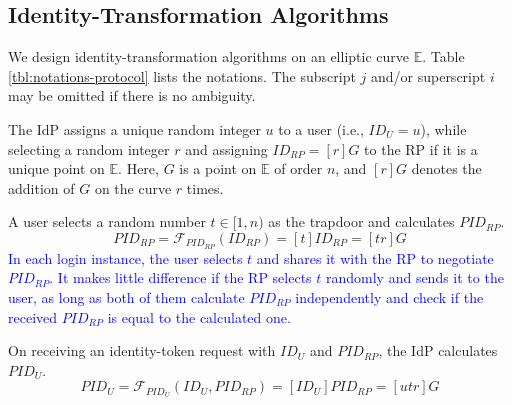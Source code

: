 
\subsection{Identity-Transformation Algorithms}
\label{subsec:overview}

We design identity-transformation algorithms %
on an elliptic curve $\mathbb{E}$.
Table \ref{tbl:notations-protocol} lists the notations. The subscript $j$ and/or superscript $i$ may be omitted if there is no ambiguity.

The IdP assigns a unique random integer $u$ to a user (i.e., $ID_U = u$),
 while selecting a random integer $r$ and assigning $ID_{RP} = [r]G$ to the RP if it is a unique point on $\mathbb{E}$.
Here, $G$ is a point on $\mathbb{E}$ of order $n$, and $[r]G$ denotes the addition of $G$ on the curve $r$ times.




 A user selects a random number $t \in [1, n)$ as the trapdoor and calculates $PID_{RP}$.
\begin{equation}
PID_{RP} = \mathcal{F}_{PID_{RP}}(ID_{RP}) = [t]{ID_{RP}} = [tr]G
\label{equ:PIDRP}
\end{equation}
\textcolor{blue}{In each login instance, the user selects $t$ and shares it with the RP to negotiate $PID_{RP}$.
It makes little difference if the RP selects $t$ randomly and sends it to the user, as long as both of them calculate $PID_{RP}$ independently and check if the received $PID_{RP}$ is equal to the calculated one.}

On receiving an identity-token request with $ID_U$ and $PID_{RP}$, the IdP calculates $PID_{U}$.
\begin{equation}
PID_{U} = \mathcal{F}_{PID_U}(ID_U, PID_{RP}) =
  [{ID_U}]{PID_{RP}} = [utr]G
 \label{equ:PIDU}
\end{equation}


